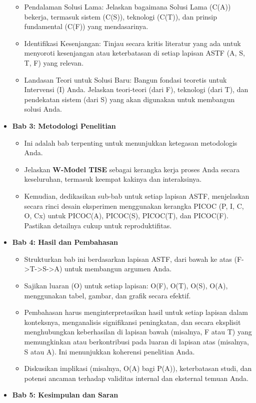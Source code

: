 \documentclass[
  letterpaper,
  DIV=11,
  numbers=noendperiod]{scrreprt}
\providecommand{\tightlist}{%
  \setlength{\itemsep}{0pt}\setlength{\parskip}{0pt}}
\begin{document}
\begin{itemize}
  \begin{itemize}
  \tightlist
  \item
    Pendalaman Solusi Lama: Jelaskan bagaimana Solusi Lama (C(A))
    bekerja, termasuk sistem (C(S)), teknologi (C(T)), dan prinsip
    fundamental (C(F)) yang mendasarinya.
  \item
    Identifikasi Kesenjangan: Tinjau secara kritis literatur yang ada
    untuk menyoroti kesenjangan atau keterbatasan di setiap lapisan ASTF
    (A, S, T, F) yang relevan.
  \item
    Landasan Teori untuk Solusi Baru: Bangun fondasi teoretis untuk
    Intervensi (I) Anda. Jelaskan teori-teori (dari F), teknologi (dari
    T), dan pendekatan sistem (dari S) yang akan digunakan untuk
    membangun solusi Anda.
  \end{itemize}
\item
  \textbf{Bab 3: Metodologi Penelitian}

  \begin{itemize}
  \tightlist
  \item
    Ini adalah bab terpenting untuk menunjukkan ketegasan metodologis
    Anda.
  \item
    Jelaskan \textbf{W-Model TISE} sebagai kerangka kerja proses Anda
    secara keseluruhan, termasuk keempat kakinya dan interaksinya.
  \item
    Kemudian, dedikasikan sub-bab untuk setiap lapisan ASTF, menjelaskan
    secara rinci desain eksperimen menggunakan kerangka PICOC (P, I, C,
    O, Cx) untuk PICOC(A), PICOC(S), PICOC(T), dan PICOC(F). Pastikan
    detailnya cukup untuk reproduktifitas.
  \end{itemize}
\item
  \textbf{Bab 4: Hasil dan Pembahasan}

  \begin{itemize}
  \tightlist
  \item
    Strukturkan bab ini berdasarkan lapisan ASTF, dari bawah ke atas
    (F-\textgreater T-\textgreater S-\textgreater A) untuk membangun
    argumen Anda.
  \item
    Sajikan luaran (O) untuk setiap lapisan: O(F), O(T), O(S), O(A),
    menggunakan tabel, gambar, dan grafik secara efektif.
  \item
    Pembahasan harus menginterpretasikan hasil untuk setiap lapisan
    dalam konteksnya, menganalisis signifikansi peningkatan, dan secara
    eksplisit menghubungkan keberhasilan di lapisan bawah (misalnya, F
    atau T) yang memungkinkan atau berkontribusi pada luaran di lapisan
    atas (misalnya, S atau A). Ini menunjukkan koherensi penelitian
    Anda.
  \item
    Diskusikan implikasi (misalnya, O(A) bagi P(A)), keterbatasan studi,
    dan potensi ancaman terhadap validitas internal dan eksternal temuan
    Anda.
  \end{itemize}
\item
  \textbf{Bab 5: Kesimpulan dan Saran}


\end{itemize}
\end{document}
